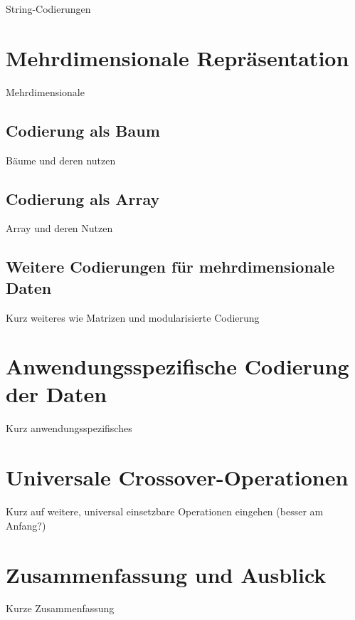 \documentclass{llncs}
\begin{document}
String-Codierungen

\section{Mehrdimensionale Repräsentation}
\label{sec:MehrdimRep}

Mehrdimensionale

\subsection{Codierung als Baum}
\label{sec:BaumCod}

Bäume und deren nutzen

\subsection{Codierung als Array}
\label{sec:ArrayCod}

Array und deren Nutzen

\subsection{Weitere Codierungen für mehrdimensionale Daten}
\label{sec:WeitereMehrdimensionale}

Kurz weiteres wie Matrizen und modularisierte Codierung

\section{Anwendungsspezifische Codierung der Daten}
\label{sec:AnwendungsspezifischeCod}

Kurz anwendungsspezifisches

\section{Universale Crossover-Operationen}
\label{sec:UniversaleOp}

Kurz auf weitere, universal einsetzbare Operationen eingehen (besser am Anfang?)

\section{Zusammenfassung und Ausblick}
\label{sec:Zusammenfassung}

Kurze Zusammenfassung

 

\end{document}
